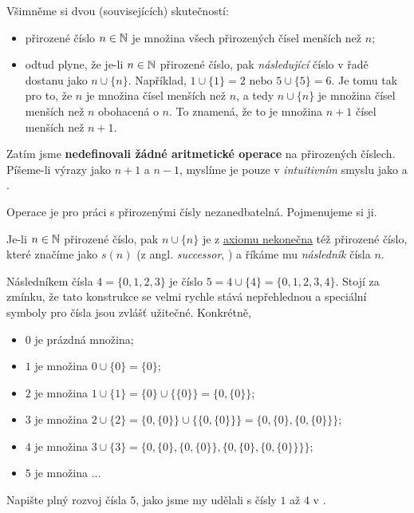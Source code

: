 Všimněme si dvou (souvisejících) skutečností:
\begin{itemize}
  \item přirozené číslo $n \in \mathbb{N}$ je množina všech přirozených čísel menších
    než $n$;
  \item odtud plyne, že je-li $n \in \mathbb{N}$ přirozené číslo, pak \emph{následující}
    číslo v řadě dostanu jako $n \cup \{n\}$. Například, $1 \cup \{1\} = 2$ nebo
    $5 \cup \{5\} = 6$. Je tomu tak pro to, že $n$ je množina čísel menších než
    $n$, a tedy $n \cup \{n\}$ je množina čísel menších než $n$ obohacená o $n$.
    To znamená, že to je množina $n + 1$ čísel menších než $n + 1$.
\end{itemize}

\begin{warning}
  Zatím jsme \textbf{nedefinovali žádné aritmetické operace} na přirozených
  číslech. Píšeme-li výrazy jako $n + 1$ a $n - 1$, myslíme je pouze v
  \emph{intuitivním} smyslu jako  a .
\end{warning}
\lessboxspace

Operace  je pro práci s přirozenými
čísly nezanedbatelná. Pojmenujeme si ji.

\begin{definition}[Následník]
  \label{def:naslednik}
  Je-li $n \in \mathbb{N}$ přirozené číslo, pak $n \cup \{n\}$ je z
  \hyperref[eq:axiom-nekonecna]{axiomu nekonečna} též přirozené číslo, které
  značíme jako $s(n)$ (z angl. \emph{successor}, ) a říkáme mu
  \emph{následník} čísla $n$.
\end{definition}

\begin{example}
  \label{exam:naslednik}
  Následníkem čísla $4 = \{0, 1, 2, 3\}$ je číslo $5 = 4 \cup \{4\} = \{0, 1, 2,
  3, 4\}$. Stojí za zmínku, že tato konstrukce se velmi rychle stává
  nepřehlednou a speciální symboly pro čísla jsou zvlášť užitečné. Konkrétně,
  \begin{itemize}
    \item $0$ je prázdná množina;
    \item $1$ je množina $0 \cup \{0\} = \{0\}$;
    \item $2$ je množina $1 \cup \{1\} = \{0\} \cup \{\{0\}\} = \{0, \{0\}\}$;
    \item 3 je množina $2 \cup \{2\} = \{0, \{0\}\} \cup \{\{0, \{0\}\}\} = \{0,
      \{0\}, \{0, \{0\}\}\}$;
    \item $4$ je množina $3 \cup \{3\} = \{0, \{0\}, \{0, \{0\}\}, \{0, \{0\},
      \{0, \{0\}\}\}\}$;
    \item $5$ je množina ...
  \end{itemize}
\end{example}

\begin{exercise}
  Napište plný rozvoj čísla $5$, jako jsme my udělali s čísly $1$ až $4$ v
  .
\end{exercise}
